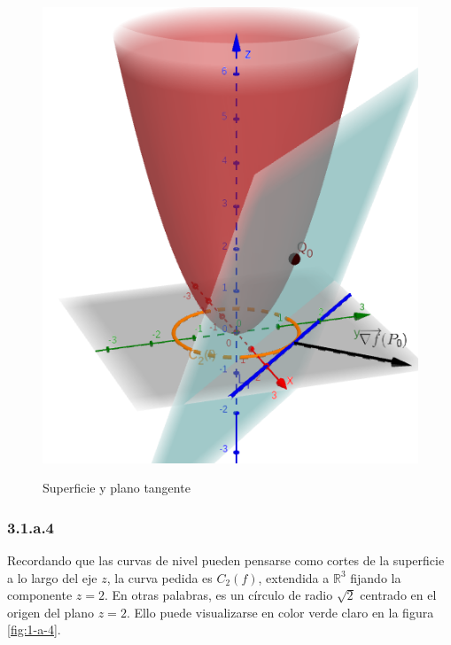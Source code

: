 \documentclass{article}
\renewcommand{\Bbb}{\mathbb}
\begin{document}
\begin{figure}[ht]
\caption{Superficie y plano tangente}
\includegraphics[scale=0.35]{img/ejercicios/3/1-a-3.png} 
\centering
\label{fig:1-a-3}
\end{figure}

\subsubsection*{3.1.a.4}
\label{subsubsec:3.1.a.4}

Recordando que las curvas de nivel pueden pensarse como cortes de la superficie a lo largo del eje $z$, la curva pedida es $C_2(f)$, extendida a $\Bbb R^3$ fijando la componente $z = 2$. En otras palabras, es un círculo de radio $\sqrt{2}$ centrado en el origen del plano $z = 2$. Ello puede visualizarse en color verde claro en la figura \ref{fig:1-a-4}.
\end{document}
